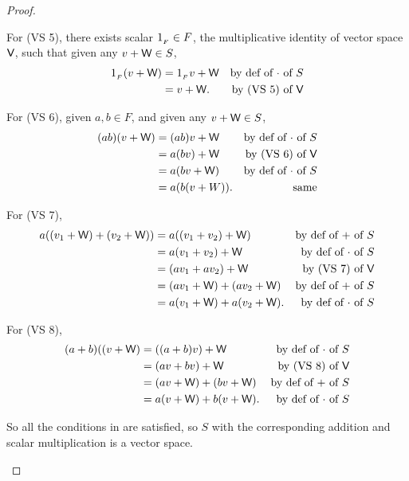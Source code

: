 \begin{proof}
\begin{enumerate}
For (VS 5), there exists scalar \(1_{_F} \in F\), the multiplicative identity of vector space \(\textsf{V}\), such that given any \(v + \textsf{W} \in S\),
\begin{align*}
    1_{_F}(v + \textsf{W})& = 1_{_F} v + \textsf{W} & \text{by def of \(\cdot\) of \(S\)} \\
                          & = v + \textsf{W}. & \text{by (VS 5) of \(\textsf{V}\)}
\end{align*}

For (VS 6), given \(a, b \in F\), and given any \(v + \textsf{W} \in S\),
\begin{align*}
    (ab)(v + \textsf{W}) & = (ab)v + \textsf{W} & \text{by def of \(\cdot\) of \(S\)} \\
                & = a(bv) + \textsf{W} & \text{by (VS 6) of \(\textsf{V}\)} \\
                & = a(bv + \textsf{W}) & \text{by def of \(\cdot\) of \(S\)} \\
                & = a(b(v + W)). & \text{same}
\end{align*}

For (VS 7),
\begin{align*}
    a((v_1 + \textsf{W}) + (v_2 + \textsf{W})) & = a((v_1 + v_2) + \textsf{W}) & \text{by def of \(+\) of \(S\)} \\
                             & = a(v_1 + v_2) + \textsf{W} & \text{by def of \(\cdot\) of \(S\)} \\
                             & = (av_1 + av_2) + \textsf{W} & \text{by (VS 7) of \(\textsf{V}\)} \\
                             & = (av_1 + \textsf{W}) + (av_2 + \textsf{W}) & \text{by def of \(+\) of \(S\)} \\
                             & = a(v_1 + \textsf{W}) + a(v_2 + \textsf{W}). & \text{by def of \(\cdot\) of \(S\)}
\end{align*}

For (VS 8),
\begin{align*}
    (a + b)((v + \textsf{W}) & = ((a + b)v) + \textsf{W} & \text{by def of \(\cdot\) of \(S\)} \\
                             & = (av + bv) + \textsf{W} & \text{by (VS 8) of \(\textsf{V}\)} \\
                             & = (av + \textsf{W}) + (bv + \textsf{W}) & \text{by def of \(+\) of \(S\)} \\
                             & = a(v + \textsf{W}) + b(v + \textsf{W}). & \text{by def of \(\cdot\) of \(S\)}
\end{align*}

So all the conditions in  are satisfied, so \(S\) with the corresponding addition and scalar multiplication is a vector space.
\end{enumerate}
\end{proof}

